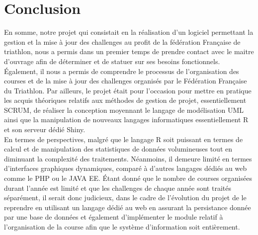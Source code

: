 \section* {Conclusion}
En somme, notre projet qui consistait en la réalisation d’un logiciel permettant  la gestion et la mise à jour des challenges au profit de la fédération Française de triathlon, nous a permis dans un premier temps de prendre contact avec le maitre d’ouvrage afin de  déterminer et de statuer sur ses besoins fonctionnels. Également, il nous a permis de comprendre le processus de l’organisation des courses et de la mise à jour des challenges organisés par le Fédération Française du Triathlon. Par ailleurs, le projet était pour l’occasion pour mettre en pratique les acquis théoriques relatifs aux méthodes de gestion de projet, essentiellement SCRUM, de réaliser la conception moyennant le langage de modélisation UML ainsi   que la manipulation de nouveaux langages informatiques essentiellement R et son serveur dédié Shiny.\\
En termes de perspectives, malgré que le langage R soit puissant en termes de calcul et de manipulation des statistiques de données volumineuses tout en diminuant la complexité des traitements. Néanmoins, il demeure limité en termes d’interfaces graphiques dynamiques, comparé à d’autres langages dédiés au web comme le PHP ou le JAVA EE. Étant donné que le nombre de courses organisées durant l’année est limité et que les challenges de chaque année sont traités séparément, il serait donc judicieux, dans le cadre de l’évolution du projet de le reprendre en utilisant un langage dédié au web en assurant la persistance donnée par une base de données et également d’implémenter le module relatif à l’organisation de la course afin que le système d’information soit entièrement. 
